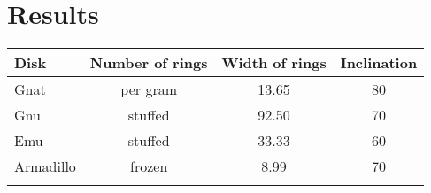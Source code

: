 \chapter{Results}

\begin{tabular}{lccc}
Disk      & Number of rings & Width of rings & Inclination \\
\hline
Gnat      & per gram        & 13.65          & 80          \\
Gnu       & stuffed         & 92.50          & 70          \\
Emu       & stuffed         & 33.33          & 60          \\
Armadillo & frozen          & 8.99           & 70          \\
\hline
\label{tab: param_study}
\end{tabular}
\\
